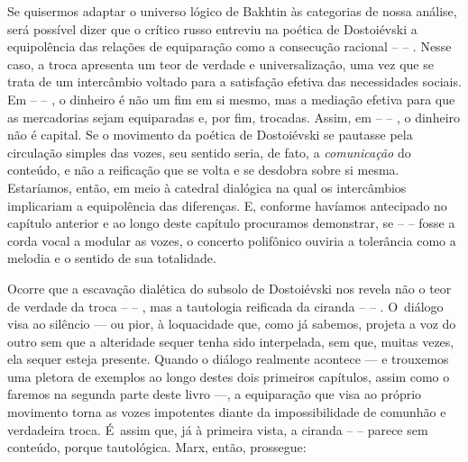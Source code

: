 Se quisermos adaptar o universo lógico de Bakhtin às categorias de nossa
análise, será possível dizer que o crítico russo entreviu na poética de
Dostoiévski a equipolência das relações de equiparação como a consecução
racional  --  -- . Nesse caso, a troca apresenta um teor de verdade e
universalização, uma vez que se trata de um intercâmbio voltado para a
satisfação efetiva das necessidades sociais. Em  --  -- , o dinheiro
é não um fim em si mesmo, mas a mediação efetiva para que as mercadorias
sejam equiparadas e, por fim, trocadas. Assim, em  --  -- , o
dinheiro não é capital. Se o movimento da poética de Dostoiévski se
pautasse pela circulação simples das vozes, seu sentido seria, de fato,
a \emph{comunicação} do conteúdo, e não a reificação que se volta e se
desdobra sobre si mesma. Estaríamos, então, em meio à catedral dialógica
na qual os intercâmbios implicariam a equipolência das diferenças. E,
conforme havíamos antecipado no capítulo anterior e ao longo deste
capítulo procuramos demonstrar, se  --  --  fosse a corda vocal a
modular as vozes, o concerto polifônico ouviria a tolerância como a
melodia e o sentido de sua totalidade.

Ocorre que a escavação dialética do subsolo de Dostoiévski nos revela
não o teor de verdade da troca  --  -- , mas a tautologia reificada
da ciranda  --  -- . O~diálogo visa ao silêncio --- ou pior, à
loquacidade que, como já sabemos, projeta a voz do outro sem que a
alteridade sequer tenha sido interpelada, sem que, muitas vezes, ela
sequer esteja presente. Quando o diálogo realmente acontece --- e
trouxemos uma pletora de exemplos ao longo destes dois primeiros
capítulos, assim como o faremos na segunda parte deste livro ---, a
equiparação que visa ao próprio movimento torna as vozes impotentes
diante da impossibilidade de comunhão e verdadeira troca. É~assim que,
já à primeira vista, a ciranda  --  --  parece sem conteúdo, porque
tautológica. Marx, então, prossegue:

